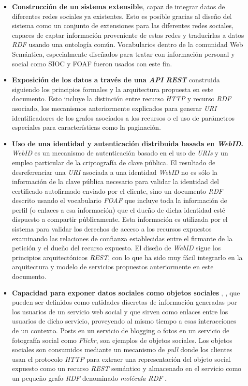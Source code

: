 \begin{itemize}
\item \textbf{Construcci\'on de un sistema extensible}, capaz de integrar datos de diferentes redes sociales ya existentes. Esto es posible gracias al dise\~no del sistema como un conjunto de extensiones para las diferentes redes sociales, capaces de captar informaci\'on proveniente de estas redes y traducirlas a datos \textit{RDF} usando una ontolog\'ia com\'un.  Vocabularios dentro de la comunidad Web Sem\'antica, especialmente dise\~nados para tratar con informaci\'on personal y social como SIOC \cite{sioc} y FOAF \cite{foaf} fueron usados con este fin.\\
\item \textbf{Exposici\'on de los datos a trav\'es de una \textit{API} \textit{REST}} construida siguiendo los principios formales y la arquitectura propuesta en este documento. Esto incluye la distinci\'on entre recurso \textit{HTTP} y recurso \textit{RDF} asociado, los mecanismos anteriormente explicados para generar \textit{URI} identificadores de los grafos asociados a los recursos o el uso de par\'ametros especiales para caracter\'isticas como la paginaci\'on.
\item \textbf{Uso de una identidad y autenticaci\'on distribuida basada en \textit{WebID}.} \textit{WebID} es un mecanismo de autenticaci\'on basado en el uso de \textit{URIs} y un empleo particular de la criptograf\'ia de clave p\'ublica. El resultado de desreferenciar una \textit{URI} asociada a una identidad \textit{WebID} no es s\'olo la informaci\'on de la clave p\'ublica necesario para validar la identidad del certificado autofirmado enviado por el cliente, sino un documento \textit{RDF} descrito usando el vocabulario \textit{FOAF} que incluye toda la informaci\'on de perfil (o enlaces a esa informaci\'on) que el due\~no de dicha identidad est\'e dispuesto a compartir p\'ublicamente. Esta informaci\'on es utilizada por el sistema para validar los derechos de acceso a los recursos expuestos examinando las relaciones de confianza establecidas entre el firmante de la petici\'on y el due\~no del recurso expuesto. El dise\~no de \textit{WebID} sigue los principios arquitect\'onicos \textit{REST}, con lo que ha sido muy f\'acil integrarlo en la arquitectura y modelo de servicios propuestos anteriormente en este documento.
\item \textbf{Capacidad para exponer datos sociales como objetos sociales} \cite{engestrom2005some}, \cite{engestrom1995voice}, que pueden ser definidos como entidades discretas de informaci\'on generadas por los usuarios de un servicio web social y que sirven como enlaces entre los usuarios de dicho servicio, proveyendo al mismo tiempo a esas interacciones de un contexto. Posts en un servicio de blogging o fotos en un servicio de fotograf\'ia social como \textit{Flickr}, son ejemplos de objetos sociales. Los objetos sociales son consumidos mediante un mecanismo de \textit{pull} donde los clientes usan el protocolo \textit{HTTP} para extraer una representaci\'on del objeto social expuesto como un recurso \textit{REST} sem\'antico \cite{kinsella2008navigating} y almacenado en el servicio como un peque\~no grafo \textit{RDF} denominado \textit{mol\'ecula RDF} \cite{ding2005tracking}. 

\end{itemize}
